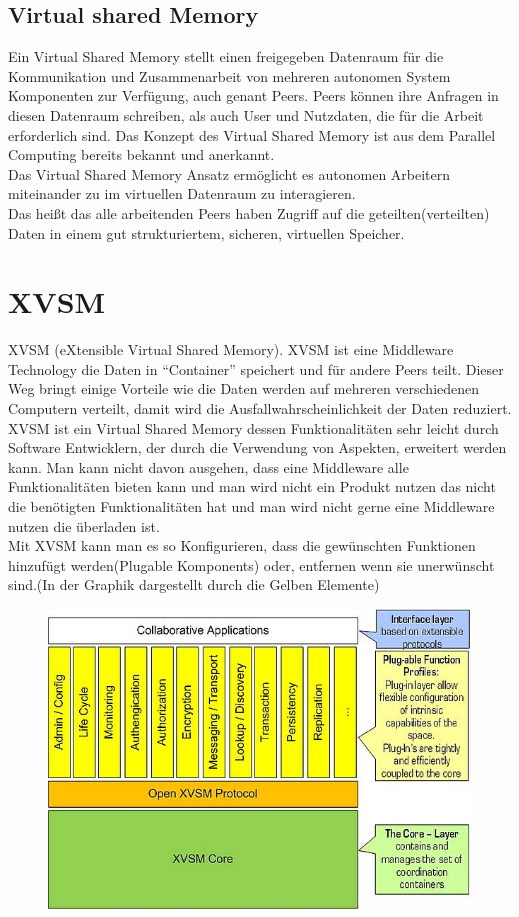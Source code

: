 \documentclass[a4paper,12pt]{scrreprt}
\begin{document}
			
			
						
			\subsection{Virtual shared Memory}
			
			
			Ein Virtual Shared Memory stellt einen freigegeben Datenraum für die Kommunikation und Zusammenarbeit von mehreren autonomen System Komponenten zur Verfügung, auch genant Peers. Peers können ihre Anfragen in diesen Datenraum schreiben, als auch User und Nutzdaten, die für die Arbeit erforderlich sind.
			Das Konzept des Virtual Shared Memory ist aus dem Parallel Computing bereits bekannt und anerkannt.\\
			Das Virtual Shared Memory Ansatz ermöglicht es autonomen Arbeitern miteinander zu im virtuellen Datenraum zu interagieren.\\
			Das heißt das alle arbeitenden Peers haben Zugriff auf die geteilten(verteilten) Daten in einem gut strukturiertem, sicheren, virtuellen Speicher.
			 
			
			
			  
		
		\section{XVSM}
		XVSM (eXtensible Virtual Shared Memory). XVSM ist eine Middleware Technology die Daten in “Container” speichert  und für andere Peers teilt. Dieser Weg bringt einige Vorteile wie die Daten werden auf mehreren verschiedenen Computern verteilt, damit wird die Ausfallwahrscheinlichkeit der Daten reduziert.\\
		
		XVSM ist ein Virtual Shared Memory dessen Funktionalitäten sehr leicht durch Software Entwicklern, der durch die Verwendung von Aspekten, erweitert werden kann. Man kann nicht davon ausgehen, dass eine Middleware alle Funktionalitäten bieten kann und man wird nicht ein Produkt nutzen das nicht die benötigten Funktionalitäten hat und man wird nicht gerne eine Middleware nutzen die überladen ist.\\
		Mit XVSM kann man es so Konfigurieren, dass die gewünschten Funktionen hinzufügt werden(Plugable Komponents) oder, entfernen wenn sie unerwünscht sind.(In der Graphik dargestellt durch die Gelben Elemente)\\
		\begin{figure}[h]
			\centering
			\includegraphics[width=0.7\linewidth]{./08570620af}
			\caption{}
			\label{fig:08570620af}
		\end{figure}
\end{document}

